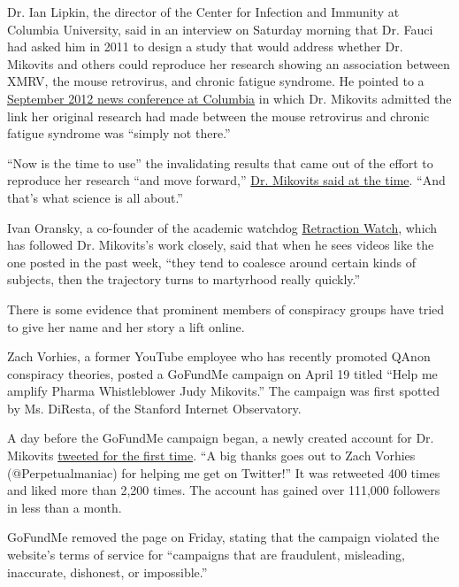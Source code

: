 Dr. Ian Lipkin, the director of the Center for Infection and Immunity at
Columbia University, said in an interview on Saturday morning that Dr.
Fauci had asked him in 2011 to design a study that would address whether
Dr. Mikovits and others could reproduce her research showing an
association between XMRV, the mouse retrovirus, and chronic fatigue
syndrome. He pointed to a
\href{https://www.mailman.columbia.edu/research/center-infection-and-immunity/cii-press-conference-multicenter-study-chronic-fatigue}{September
2012 news conference at Columbia} in which Dr. Mikovits admitted the
link her original research had made between the mouse retrovirus and
chronic fatigue syndrome was ``simply not there.''

``Now is the time to use'' the invalidating results that came out of the
effort to reproduce her research ``and move forward,''
\href{https://www.youtube.com/watch?list=PLm8X_9pQvTbVCBWor35cXIOJpsjGfCnKm\&time_continue=334\&v=Y3dJsNZuNUk\&feature=emb_title}{Dr.
Mikovits said at the time}. ``And that's what science is all about.''

Ivan Oransky, a co-founder of the academic watchdog
\href{https://retractionwatch.com/2020/05/06/who-is-judy-mikovits/}{Retraction
Watch}, which has followed Dr. Mikovits's work closely, said that when
he sees videos like the one posted in the past week, ``they tend to
coalesce around certain kinds of subjects, then the trajectory turns to
martyrhood really quickly.''

There is some evidence that prominent members of conspiracy groups have
tried to give her name and her story a lift online.

Zach Vorhies, a former YouTube employee who has recently promoted QAnon
conspiracy theories, posted a GoFundMe campaign on April 19 titled
``Help me amplify Pharma Whistleblower Judy Mikovits.'' The campaign was
first spotted by Ms. DiResta, of the Stanford Internet Observatory.

A day before the GoFundMe campaign began, a newly created account for
Dr. Mikovits
\href{https://twitter.com/DrJudyAMikovits/status/1251647330572476417}{tweeted
for the first time}. ``A big thanks goes out to Zach Vorhies
(@Perpetualmaniac) for helping me get on Twitter!'' It was retweeted 400
times and liked more than 2,200 times. The account has gained over
111,000 followers in less than a month.

GoFundMe removed the page on Friday, stating that the campaign violated
the website's terms of service for ``campaigns that are fraudulent,
misleading, inaccurate, dishonest, or impossible.''

